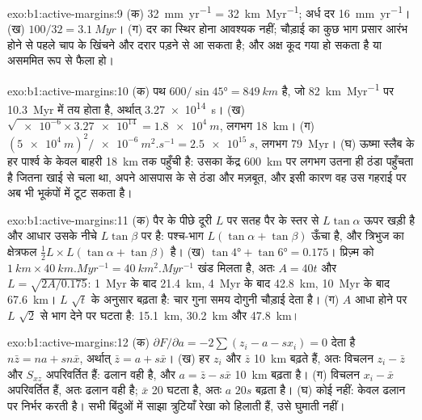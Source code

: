 \begin{solution}{exo:b1:active-margins:9}
(क) \qty{32}{mm.yr^{-1}} = \qty{32}{km.Myr^{-1}}; अर्ध दर \qty{16}{mm.yr^{-1}}। (ख) $100/32 = \qty{3.1}{Myr}$। (ग) दर का स्थिर होना आवश्यक नहीं; चौड़ाई का कुछ भाग प्रसार आरंभ होने से पहले चाप के खिंचने और दरार पड़ने से आ सकता है; और अक्ष कूद गया हो सकता है या असममित रूप से फैला हो।
\end{solution}

\begin{solution}{exo:b1:active-margins:10}
(क) पथ $600/\sin\ang{45} = \qty{849}{km}$ है, जो \qty{82}{km.Myr^{-1}} पर \qty{10.3}{Myr} में तय होता है, अर्थात् \qty{3.27e14}{s}। (ख) $\sqrt{\num{e-6}\times\num{3.27e14}} = \qty{1.8e4}{m}$, लगभग \qty{18}{km}। (ग) $(\qty{5e4}{m})^2/\qty{e-6}{m^2.s^{-1}} = \qty{2.5e15}{s}$, लगभग \qty{79}{Myr}। (घ) ऊष्मा स्लैब के हर पार्श्व के केवल बाहरी \qty{18}{km} तक पहुँची है: उसका केंद्र \qty{600}{km} पर लगभग उतना ही ठंडा पहुँचता है जितना खाई से चला था, अपने आसपास के  से ठंडा और मज़बूत, और इसी कारण वह उस गहराई पर अब भी भूकंपों में टूट सकता है।
\end{solution}

\begin{solution}{exo:b1:active-margins:11}
(क) पैर के पीछे दूरी $L$ पर सतह पैर के स्तर से $L\tan\alpha$ ऊपर खड़ी है और आधार उसके नीचे $L\tan\beta$ पर है: पश्च-भाग $L(\tan\alpha + \tan\beta)$ ऊँचा है, और त्रिभुज का क्षेत्रफल $\frac12 L\times L(\tan\alpha + \tan\beta)$ है। (ख) $\tan\ang{4} + \tan\ang{6} =
0.175$। प्रिज़्म को $\qty{1}{km}\times\qty{40}{km.Myr^{-1}} =
\qty{40}{km^2.Myr^{-1}}$ खंड मिलता है, अतः $A = 40t$ और $L = \sqrt{2A/0.175}$: \qty{1}{Myr} के बाद \qty{21.4}{km}, \qty{4}{Myr} के बाद \qty{42.8}{km}, \qty{10}{Myr} के बाद \qty{67.6}{km}। $L$ $\sqrt t$ के अनुसार बढ़ता है: चार गुना समय दोगुनी चौड़ाई देता है। (ग) $A$ आधा होने पर $L$ $\sqrt2$ से भाग देने पर घटता है: \qty{15.1}{km}, \qty{30.2}{km} और \qty{47.8}{km}।
\end{solution}

\begin{solution}{exo:b1:active-margins:12}
(क) $\partial F/\partial a = -2\sum(z_i - a - s x_i) = 0$ देता है $n\bar z = na + sn\bar x$, अर्थात् $\bar z = a + s\bar x$। (ख) हर $z_i$ और $\bar z$ \qty{10}{km} बढ़ते हैं, अतः विचलन $z_i - \bar z$ और $S_{xz}$ अपरिवर्तित हैं: ढलान वही है, और $a = \bar z - s\bar x$ \qty{10}{km} बढ़ता है। (ग) विचलन $x_i - \bar x$ अपरिवर्तित हैं, अतः ढलान वही है; $\bar x$ 20 घटता है, अतः $a$ $20s$ बढ़ता है। (घ) कोई नहीं:  केवल ढलान पर निर्भर करती है। सभी बिंदुओं में साझा त्रुटियाँ रेखा को हिलाती हैं, उसे घुमाती नहीं।
\end{solution}

